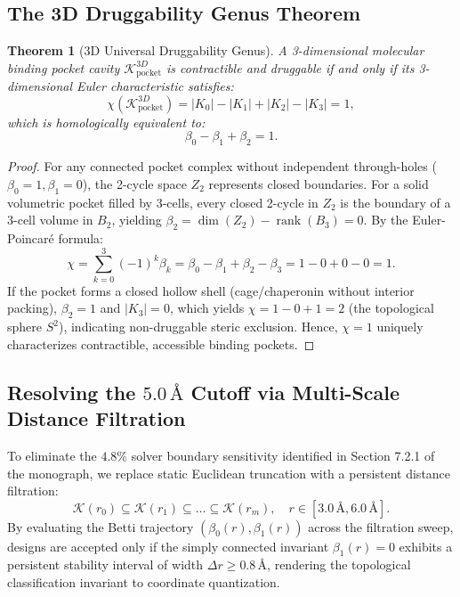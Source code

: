 \documentclass[11pt, a4paper]{article}
\theoremstyle{definition}
\theoremstyle{plain}
\newtheorem{theorem}{Theorem}[section]
\theoremstyle{remark}
\begin{document}
\subsection{The 3D Druggability Genus Theorem}

\begin{theorem}[3D Universal Druggability Genus]
\label{thm:3d_druggability}
A 3-dimensional molecular binding pocket cavity $\mathcal{K}_{\text{pocket}}^{3D}$ is contractible and druggable if and only if its 3-dimensional Euler characteristic satisfies:
\begin{equation}
    \chi(\mathcal{K}_{\text{pocket}}^{3D}) = |K_0| - |K_1| + |K_2| - |K_3| = 1,
\end{equation}
which is homologically equivalent to:
\begin{equation}
    \beta_0 - \beta_1 + \beta_2 = 1.
\end{equation}
\end{theorem}

\begin{proof}
For any connected pocket complex without independent through-holes ($\beta_0 = 1, \beta_1 = 0$), the 2-cycle space $Z_2$ represents closed boundaries. For a solid volumetric pocket filled by 3-cells, every closed 2-cycle in $Z_2$ is the boundary of a 3-cell volume in $B_2$, yielding $\beta_2 = \dim(Z_2) - \operatorname{rank}(B_3) = 0$. By the Euler-Poincaré formula:
\begin{equation}
    \chi = \sum_{k=0}^3 (-1)^k \beta_k = \beta_0 - \beta_1 + \beta_2 - \beta_3 = 1 - 0 + 0 - 0 = 1.
\end{equation}
If the pocket forms a closed hollow shell (cage/chaperonin without interior packing), $\beta_2 = 1$ and $|K_3| = 0$, which yields $\chi = 1 - 0 + 1 = 2$ (the topological sphere $S^2$), indicating non-druggable steric exclusion. Hence, $\chi = 1$ uniquely characterizes contractible, accessible binding pockets.
\end{proof}

\subsection{Resolving the \texorpdfstring{$5.0\,\text{\AA}$}{5.0 A} Cutoff via Multi-Scale Distance Filtration}
To eliminate the $4.8\%$ solver boundary sensitivity identified in Section 7.2.1 of the monograph, we replace static Euclidean truncation with a persistent distance filtration:
\begin{equation}
    \mathcal{K}(r_0) \subseteq \mathcal{K}(r_1) \subseteq \dots \subseteq \mathcal{K}(r_m), \quad r \in [3.0\,\text{\AA}, 6.0\,\text{\AA}].
\end{equation}
By evaluating the Betti trajectory $(\beta_0(r), \beta_1(r))$ across the filtration sweep, designs are accepted only if the simply connected invariant $\beta_1(r) = 0$ exhibits a persistent stability interval of width $\Delta r \ge 0.8\,\text{\AA}$, rendering the topological classification invariant to coordinate quantization.
\end{document}
